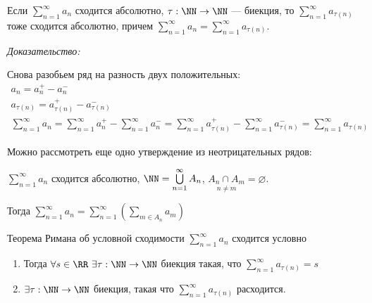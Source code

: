 \begin{assrt}{}{}
    Если \( \sum\limits_{n = 1}^{\infty} a_n \) сходится абсолютно,
    \( \tau : \NN \to \NN \) --- биекция,
    то \( \sum\limits_{n = 1}^{\infty}  a_{\tau(n)} \)
    тоже сходится абсолютно, причем \( \sum\limits_{n = 1}^{\infty} a_n = \sum\limits_{n = 1}^{\infty} a_{\tau(n)} \).
\end{assrt}

\textit{Доказательство:}

Снова разобьем ряд на разность двух положительных:
\begin{gather*}
    a_n = a_n^+ - a_n^-
    \\
    a_{\tau(n)} = a_{\tau(n)}^+ - a_{\tau(n)}^-
    \\
    \sum\limits_{n = 1}^{\infty} a_n
    =
    \sum\limits_{n = 1}^{\infty} a_n^+
    -
    \sum\limits_{n = 1}^{\infty} a_n^-
    =
    \sum\limits_{n = 1}^{\infty} a_{\tau(n)}^+
    -
    \sum\limits_{n = 1}^{\infty} a_{\tau(n)}^-
    =
    \sum\limits_{n = 1}^{\infty} a_{\tau(n)}
\end{gather*}

Можно рассмотреть еще одно утверждение из неотрицательных рядов:
\begin{assrt}{}{}
    \( \sum\limits_{n = 1}^{\infty} a_n \) сходится абсолютно,
    \( \NN = \bigcup\limits_{n = 1}^{\infty} A_n \),
    \( \underset{n \neq m}{A_n \cap A_m} = \varnothing \).

    Тогда \( \sum\limits_{n = 1}^{\infty} a_n = \sum\limits_{n = 1}^{\infty} \left( \sum\limits_{m \in A_n}^{} a_m \right) \)
\end{assrt}

\begin{thrm}{Теорема Римана об условной сходимости}{}
    \( \sum\limits_{n = 1}^{\infty} a_n \) сходится условно
    \begin{enumerate}
        \item
            Тогда \( \forall s \in \RR \ \exists \tau : \NN \to \NN \) биекция такая,
            что \( \sum\limits_{n = 1}^{\infty} a_{\tau(n)} = s \)
        \item
            \( \exists \tau : \NN \to \NN \) биекция, такая что \( \sum\limits_{n = 1}^{\infty} a_{\tau(n)} \) расходится.
    \end{enumerate}
\end{thrm}

